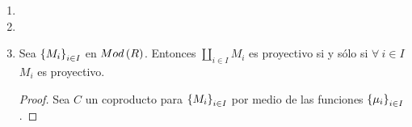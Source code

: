 \documentclass{article}
\begin{document}
\begin{enumerate}[label=\textbf{Ej \arabic*.}]
\begin{proof}
\begin{align*}
			\end{align*}
			Por su parte 
			\begin{align*}			
				\functhom{A}{}{\mathcal{A}}\lrprth{gf}\lrprth{\alpha}&=\lrprth{Fgf}\lrprth{\alpha}\\
					&=gf\lrprth{\alpha}=g\lrprth{f\alpha}\\
					&=Fg\lrprth{Ff(\alpha)}, && f\alpha\in\functhom{A}{C}{\mathcal{A}}\\
					&=FgFf\lrprth{\alpha} \\
					\therefore\  \functhom{A}{}{\mathcal{A}}\lrprth{gf}=\functhom{A}{}{\mathcal{A}}\lrprth{g}&\functhom{A}{}{\mathcal{A}}\lrprth{f}.
			\end{align*}
			Con lo cual se ha verificado que $\functhom{A}{-}{\mathcal{A}}$ es un funtor covariante.\\
			Finalmente, dado que la composición en $Hom\lrprth{\mathcal{A}}$ es $\mathbb{Z}$-bilineal se tiene que
			\begin{align*}
				\functhom{A}{-}{\mathcal{A}}\lrprth{f+g}\lrprth{\alpha}&=F\lrprth{f+g}\lrprth{\alpha}\\
				&=\lrprth{f+g}\alpha=f\alpha+g\alpha\\
				&=Ff\lrprth{\alpha}+Fg\lrprth{\alpha}\\
				\implies \functhom{A}{-}{\mathcal{A}}\lrprth{f+g}&=\functhom{A}{-}{\mathcal{A}}\lrprth{f}+\functhom{A}{-}{\mathcal{A}}\lrprth{g}
			\end{align*}
			De modo que \begin{equation*}
				\functhom{A}{}{\mathcal{A}}:\functhom{B}{C}{\mathcal{A}}\to\functhom{\functhom{A}{B}{\mathcal{A}}}{\functhom{A}{C}{\mathcal{A}}}{Ab}
			\end{equation*}es un morfismo de grupos abelianos. Con lo cual, dado que $Ab$ es una categoría preaditiva (esto ya que la composición de morfismos de grupos abelianos es $\mathbb{Z}$-bilineal), se tiene que $\functhom{A}{}{\mathcal{A}}$ es un funtor aditivo.\\
			La demostración de $b)$ se realiza en forma análoga.\\
		\end{proof}
		\item 
		\item
		\item Sea ${\left\{{M}_{i}\right\}}_{i\in I}$ en $Mod\left(R\right)$. Entonces $\coprod\limits_{i\in I}M_i$ es proyectivo si y sólo si $\forall\ i\in I$ $M_i$  es proyectivo.
		\begin{proof}
			Sea $C$ un coproducto para ${\left\{{M}_{i}\right\}}_{i\in I}$ por medio de las funciones ${\left\{{\mu}_{i}\right\}}_{i\in I}$.

\end{proof}
\end{enumerate}
\end{document}
